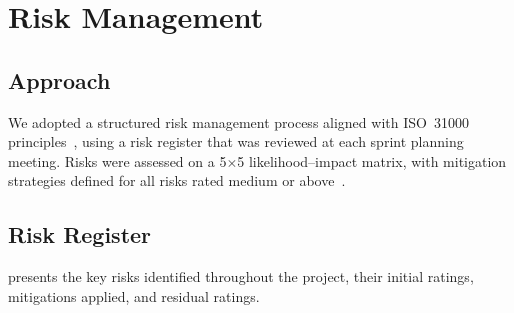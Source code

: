 \section{Risk Management}
\label{sec:risk_management}

\subsection{Approach}

We adopted a structured risk management process aligned with ISO~31000 principles~\cite{iso31000}, using a risk register that was reviewed at each sprint planning meeting. Risks were assessed on a 5$\times$5 likelihood--impact matrix, with mitigation strategies defined for all risks rated medium or above~\cite{hillson2009managing}.

\subsection{Risk Register}

 presents the key risks identified throughout the project, their initial ratings, mitigations applied, and residual ratings.

